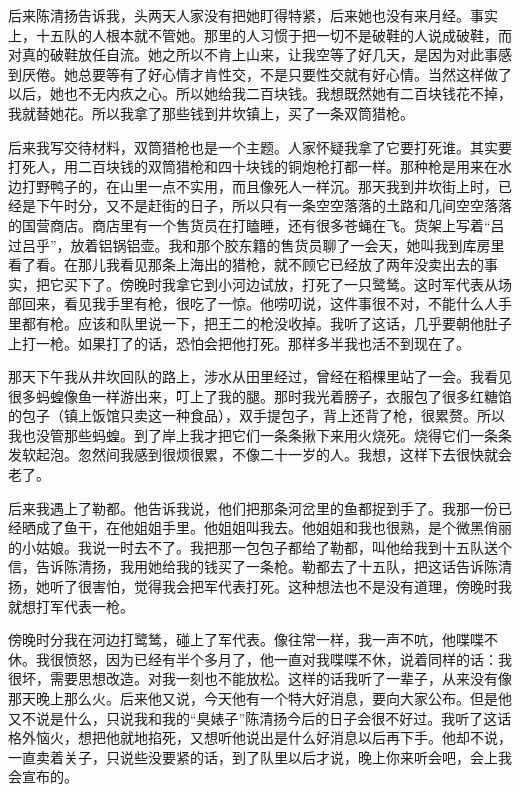  后来陈清扬告诉我，头两天人家没有把她盯得特紧，后来她也没有来月经。事实上，十五队的人根本就不管她。那里的人习惯于把一切不是破鞋的人说成破鞋，而对真的破鞋放任自流。她之所以不肯上山来，让我空等了好几天，是因为对此事感到厌倦。她总要等有了好心情才肯性交，不是只要性交就有好心情。当然这样做了以后，她也不无内疚之心。所以她给我二百块钱。我想既然她有二百块钱花不掉，我就替她花。所以我拿了那些钱到井坎镇上，买了一条双筒猎枪。 
 
 后来我写交待材料，双筒猎枪也是一个主题。人家怀疑我拿了它要打死谁。其实要打死人，用二百块钱的双筒猎枪和四十块钱的铜炮枪打都一样。那种枪是用来在水边打野鸭子的，在山里一点不实用，而且像死人一样沉。那天我到井坎街上时，已经是下午时分，又不是赶街的日子，所以只有一条空空落落的土路和几间空空落落的国营商店。商店里有一个售货员在打瞌睡，还有很多苍蝇在飞。货架上写着“吕过吕乎”，放着铝锅铝壶。我和那个胶东籍的售货员聊了一会天，她叫我到库房里看了看。在那儿我看见那条上海出的猎枪，就不顾它已经放了两年没卖出去的事实，把它买下了。傍晚时我拿它到小河边试放，打死了一只鹭鸶。这时军代表从场部回来，看见我手里有枪，很吃了一惊。他唠叨说，这件事很不对，不能什么人手里都有枪。应该和队里说一下，把王二的枪没收掉。我听了这话，几乎要朝他肚子上打一枪。如果打了的话，恐怕会把他打死。那样多半我也活不到现在了。 
 
 那天下午我从井坎回队的路上，涉水从田里经过，曾经在稻棵里站了一会。我看见很多蚂蝗像鱼一样游出来，叮上了我的腿。那时我光着膀子，衣服包了很多红糖馅的包子（镇上饭馆只卖这一种食品），双手提包子，背上还背了枪，很累赘。所以我也没管那些蚂蝗。到了岸上我才把它们一条条揪下来用火烧死。烧得它们一条条发软起泡。忽然间我感到很烦很累，不像二十一岁的人。我想，这样下去很快就会老了。 
 
 后来我遇上了勒都。他告诉我说，他们把那条河岔里的鱼都捉到手了。我那一份已经晒成了鱼干，在他姐姐手里。他姐姐叫我去。他姐姐和我也很熟，是个微黑俏丽的小姑娘。我说一时去不了。我把那一包包子都给了勒都，叫他给我到十五队送个信，告诉陈清扬，我用她给我的钱买了一条枪。勒都去了十五队，把这话告诉陈清扬，她听了很害怕，觉得我会把军代表打死。这种想法也不是没有道理，傍晚时我就想打军代表一枪。 
 
 傍晚时分我在河边打鹭鸶，碰上了军代表。像往常一样，我一声不吭，他喋喋不休。我很愤怒，因为已经有半个多月了，他一直对我喋喋不休，说着同样的话：我很坏，需要思想改造。对我一刻也不能放松。这样的话我听了一辈子，从来没有像那天晚上那么火。后来他又说，今天他有一个特大好消息，要向大家公布。但是他又不说是什么，只说我和我的“臭婊子”陈清扬今后的日子会很不好过。我听了这话格外恼火，想把他就地掐死，又想听他说出是什么好消息以后再下手。他却不说，一直卖着关子，只说些没要紧的话，到了队里以后才说，晚上你来听会吧，会上我会宣布的。 
 

